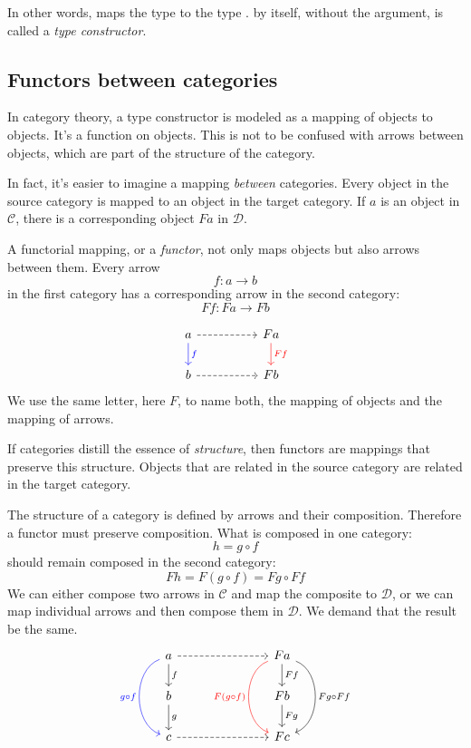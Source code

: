 \documentclass[DaoFP]{subfiles}
\begin{document}
In other words,  maps the type  to the type .  by itself, without the argument, is called a \emph{type constructor}. 

\subsection{Functors between categories}
In category theory, a type constructor is modeled as a mapping of objects to objects. It's a function on objects. This is not to be confused with arrows between objects, which are part of the structure of the category. 

In fact, it's easier to imagine a mapping \emph{between} categories. Every object in the source category is mapped to an object in the target category. If $a$ is an object in $\mathcal{C}$, there is a corresponding object $F a$ in $\mathcal{D}$.

A functorial mapping, or a \emph{functor}, not only maps objects but also arrows between them. Every arrow 
\[ f \colon a \to b\]
in the first category has a corresponding arrow in the second category:
\[ F f \colon F a \to F b\]


\[
 \begin{tikzcd}
 a 
 \arrow[d, blue, "f"]
\arrow[rr, dashed]
 && F a
  \arrow[d, red, "F f"]
 \\
 b 
 \arrow[rr, dashed]
&& F b
  \end{tikzcd}
\]
We use the same letter, here $F$, to name both, the mapping of objects and the mapping of arrows. 

If categories distill the essence of \emph{structure}, then functors are mappings that preserve this structure. Objects that are related in the source category are related in the target category. 

The structure of a category is defined by arrows and their composition. Therefore a functor must preserve composition. What is composed in one category:
\[ h = g \circ f \]
should remain composed in the second category:
\[ F h = F (g \circ f) = F g \circ F f \]
We can either compose two arrows in $\mathcal{C}$ and map the composite to $\mathcal{D}$, or we can map individual arrows and then compose them in $\mathcal{D}$. We demand that the result be the same.
\[
 \begin{tikzcd}
 a 
 \arrow[d, "f"]
\arrow[rrr, dashed]
\arrow[dd, bend right = 70, blue, "g \circ f"']
 &&& F a
  \arrow[d, "F f"]
  \arrow[dd, bend left = 70, "F g \circ F f"]
  \arrow[dd, bend right = 70, red, "F (g \circ f)"']
 \\
 b 
 \arrow[d, "g"]
&&& F b
 \arrow[d, "F g"]
 \\
 c
 \arrow[rrr, dashed]
&&& F c
  \end{tikzcd}
\]
\end{document}
